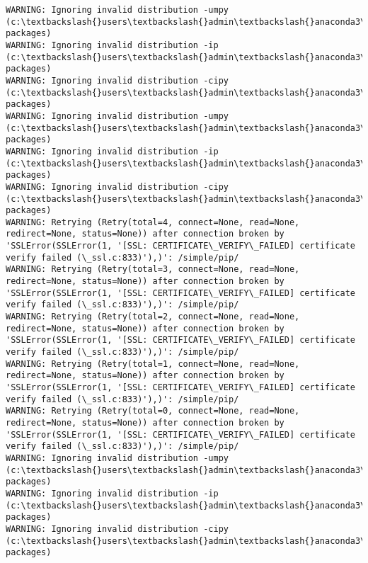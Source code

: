 \documentclass[11pt]{article}
\begin{document}
    \begin{Verbatim}[commandchars=\\\{\}]
WARNING: Ignoring invalid distribution -umpy (c:\textbackslash{}users\textbackslash{}admin\textbackslash{}anaconda3\textbackslash{}lib\textbackslash{}site-packages)
WARNING: Ignoring invalid distribution -ip (c:\textbackslash{}users\textbackslash{}admin\textbackslash{}anaconda3\textbackslash{}lib\textbackslash{}site-packages)
WARNING: Ignoring invalid distribution -cipy (c:\textbackslash{}users\textbackslash{}admin\textbackslash{}anaconda3\textbackslash{}lib\textbackslash{}site-packages)
WARNING: Ignoring invalid distribution -umpy (c:\textbackslash{}users\textbackslash{}admin\textbackslash{}anaconda3\textbackslash{}lib\textbackslash{}site-packages)
WARNING: Ignoring invalid distribution -ip (c:\textbackslash{}users\textbackslash{}admin\textbackslash{}anaconda3\textbackslash{}lib\textbackslash{}site-packages)
WARNING: Ignoring invalid distribution -cipy (c:\textbackslash{}users\textbackslash{}admin\textbackslash{}anaconda3\textbackslash{}lib\textbackslash{}site-packages)
WARNING: Retrying (Retry(total=4, connect=None, read=None, redirect=None, status=None)) after connection broken by 'SSLError(SSLError(1, '[SSL: CERTIFICATE\_VERIFY\_FAILED] certificate verify failed (\_ssl.c:833)'),)': /simple/pip/
WARNING: Retrying (Retry(total=3, connect=None, read=None, redirect=None, status=None)) after connection broken by 'SSLError(SSLError(1, '[SSL: CERTIFICATE\_VERIFY\_FAILED] certificate verify failed (\_ssl.c:833)'),)': /simple/pip/
WARNING: Retrying (Retry(total=2, connect=None, read=None, redirect=None, status=None)) after connection broken by 'SSLError(SSLError(1, '[SSL: CERTIFICATE\_VERIFY\_FAILED] certificate verify failed (\_ssl.c:833)'),)': /simple/pip/
WARNING: Retrying (Retry(total=1, connect=None, read=None, redirect=None, status=None)) after connection broken by 'SSLError(SSLError(1, '[SSL: CERTIFICATE\_VERIFY\_FAILED] certificate verify failed (\_ssl.c:833)'),)': /simple/pip/
WARNING: Retrying (Retry(total=0, connect=None, read=None, redirect=None, status=None)) after connection broken by 'SSLError(SSLError(1, '[SSL: CERTIFICATE\_VERIFY\_FAILED] certificate verify failed (\_ssl.c:833)'),)': /simple/pip/
WARNING: Ignoring invalid distribution -umpy (c:\textbackslash{}users\textbackslash{}admin\textbackslash{}anaconda3\textbackslash{}lib\textbackslash{}site-packages)
WARNING: Ignoring invalid distribution -ip (c:\textbackslash{}users\textbackslash{}admin\textbackslash{}anaconda3\textbackslash{}lib\textbackslash{}site-packages)
WARNING: Ignoring invalid distribution -cipy (c:\textbackslash{}users\textbackslash{}admin\textbackslash{}anaconda3\textbackslash{}lib\textbackslash{}site-packages)

\end{Verbatim}
\end{document}
